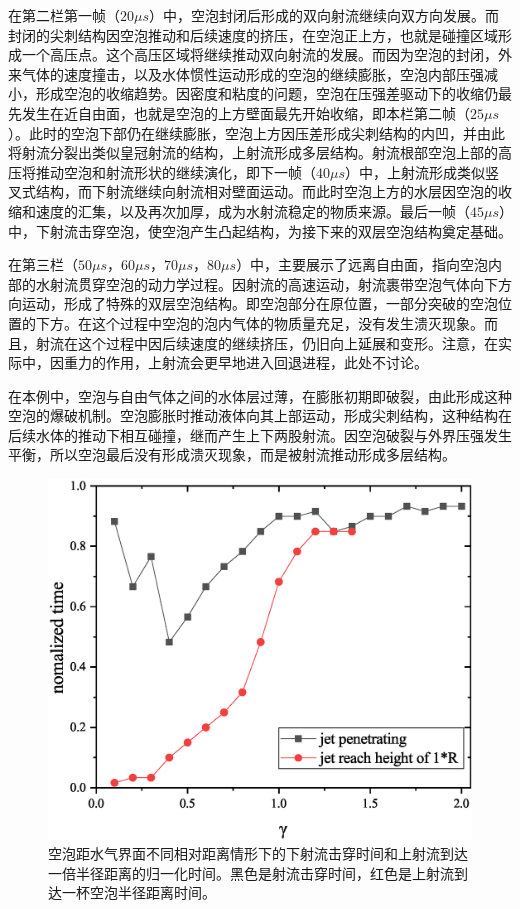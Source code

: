 在第二栏第一帧（$20 \mu s$）中，空泡封闭后形成的双向射流继续向双方向发展。而封闭的尖刺结构因空泡推动和后续速度的挤压，在空泡正上方，也就是碰撞区域形成一个高压点。这个高压区域将继续推动双向射流的发展。而因为空泡的封闭，外来气体的速度撞击，以及水体惯性运动形成的空泡的继续膨胀，空泡内部压强减小，形成空泡的收缩趋势。因密度和粘度的问题，空泡在压强差驱动下的收缩仍最先发生在近自由面，也就是空泡的上方壁面最先开始收缩，即本栏第二帧（$25 \mu s$）。此时的空泡下部仍在继续膨胀，空泡上方因压差形成尖刺结构的内凹，并由此将射流分裂出类似皇冠射流的结构，上射流形成多层结构。射流根部空泡上部的高压将推动空泡和射流形状的继续演化，即下一帧（$40 \mu s$）中，上射流形成类似竖叉式结构，而下射流继续向射流相对壁面运动。而此时空泡上方的水层因空泡的收缩和速度的汇集，以及再次加厚，成为水射流稳定的物质来源。最后一帧（$45 \mu s$）中，下射流击穿空泡，使空泡产生凸起结构，为接下来的双层空泡结构奠定基础。

在第三栏（$ 50\mu s$，$60 \mu s$，$70 \mu s$，$ 80\mu s$）中，主要展示了远离自由面，指向空泡内部的水射流贯穿空泡的动力学过程。因射流的高速运动，射流裹带空泡气体向下方向运动，形成了特殊的双层空泡结构。即空泡部分在原位置，一部分突破的空泡位置的下方。在这个过程中空泡的泡内气体的物质量充足，没有发生溃灭现象。而且，射流在这个过程中因后续速度的继续挤压，仍旧向上延展和变形。注意，在实际中，因重力的作用，上射流会更早地进入回退进程，此处不讨论。

在本例中，空泡与自由气体之间的水体层过薄，在膨胀初期即破裂，由此形成这种空泡的爆破机制。空泡膨胀时推动液体向其上部运动，形成尖刺结构，这种结构在后续水体的推动下相互碰撞，继而产生上下两股射流。因空泡破裂与外界压强发生平衡，所以空泡最后没有形成溃灭现象，而是被射流推动形成多层结构。


\begin{figure}[h]
    \centering
    \includegraphics[width=0.6\linewidth]{img/fig3.airjettime.eps}
    \caption[水气界面附近情景下射流击穿时间和上射流到达一倍半径的归一化时间]{空泡距水气界面不同相对距离情形下的下射流击穿时间和上射流到达一倍半径距离的归一化时间。黑色是射流击穿时间，红色是上射流到达一杯空泡半径距离时间。}
    \label{fig3.airjettime}
\end{figure}


